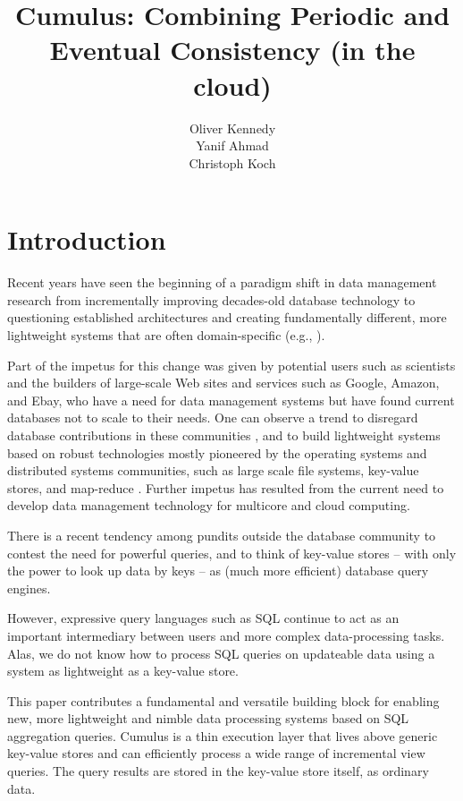 \documentclass{vldb}
\title{Cumulus: Combining Periodic and Eventual Consistency (in the cloud)}
\author{
\alignauthor
Oliver Kennedy\\
  \affaddr{Cornell University}
  \affaddr{okennedy@cs.cornell.edu}
\alignauthor
Yanif Ahmad\\
  \affaddr{Cornell University}
  \affaddr{yanif@cs.cornell.edu}
\alignauthor
Christoph Koch\\
  \affaddr{Cornell University}
  \affaddr{koch@cs.cornell.edu}
}
\date{}
\begin{document}
\maketitle

\begin{abstract}

\end{abstract}

\section{Introduction}

Recent years have seen the beginning of a paradigm shift in data management research from incrementally improving decades-old database technology to questioning established architectures  and creating fundamentally different, more lightweight systems that are often domain-specific (e.g.,
\cite{DBLP:conf/vldb/StonebrakerMAHHH07,DBLP:journals/pvldb/KallmanKNPRZJMSZHA08}).

Part of the impetus for this change was given by potential users such as scientists and the builders of large-scale Web sites and services such as Google, Amazon, and Ebay, who have a need for data management systems but have found current databases not to scale to their needs. One can observe a trend to disregard database contributions in these communities \cite{dbcolumn, DBLP:conf/sigmod/PavloPRADMS09}, and to build lightweight systems based on robust technologies mostly pioneered by the operating systems and distributed systems communities, such as large scale file systems, key-value stores, and map-reduce \cite{DBLP:journals/cacm/DeanG08, DBLP:journals/tocs/ChangDGHWBCFG08}. Further impetus has resulted from the current need to develop data management technology for multicore and cloud computing.

There is a recent tendency among pundits outside the database community to contest the need for powerful queries, and to think of key-value stores -- with only the power to look up data by keys -- as (much more efficient) database query engines.

However, expressive query languages such as SQL continue to act as an important intermediary between users and more complex data-processing tasks.  Alas, we do not know how to process SQL queries on updateable data using a system as lightweight as a key-value store.

This paper contributes a fundamental and versatile building block for enabling new, more lightweight and nimble data processing systems based on SQL aggregation queries.  Cumulus is a thin execution layer that lives above generic key-value stores and can efficiently process a wide range of incremental view queries.  The query results are stored in the key-value store itself, as ordinary data. 
\end{document}
